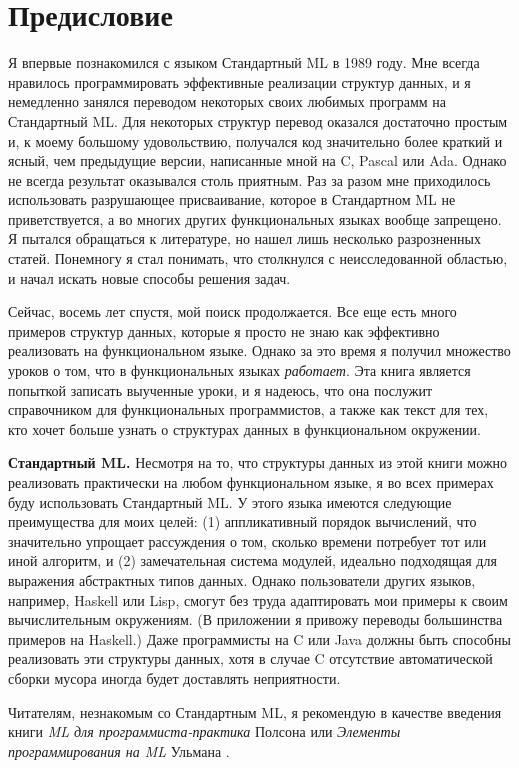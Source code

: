 \chapter*{Предисловие}

Я впервые познакомился с языком Стандартный ML в 1989 году. Мне всегда
нравилось программировать эффективные реализации структур данных,
и я немедленно занялся переводом некоторых своих любимых программ
на Стандартный ML. Для некоторых структур перевод оказался достаточно
простым и, к моему большому удовольствию, получался код значительно более краткий
и ясный, чем предыдущие версии, написанные мной на C, Pascal или
Ada.  Однако не всегда результат оказывался столь приятным. Раз за
разом мне приходилось использовать разрушающее присваивание, которое в
Стандартном ML не приветствуется, а во многих других функциональных
языках вообще запрещено.  Я пытался обращаться к литературе, но
нашел лишь несколько разрозненных статей.  Понемногу я стал понимать,
что столкнулся с неисследованной областью, и начал искать новые
способы решения задач.

Сейчас, восемь лет спустя, мой поиск продолжается. Все еще есть много
примеров структур данных, которые я просто не знаю как эффективно
реализовать на функциональном языке. Однако за это время я получил
множество уроков о том, что в функциональных языках
\textit{работает}.  Эта книга является попыткой записать выученные
уроки, и я надеюсь, что она послужит справочником для функциональных
программистов, а также как текст для тех, кто хочет больше узнать о
структурах данных в функциональном окружении.

\textbf{Стандартный ML.} Несмотря на то, что структуры данных из этой
книги можно реализовать практически на любом функциональном языке, я
во всех примерах буду использовать Стандартный ML.  У этого языка
имеются следующие преимущества для моих целей: (1)  аппликативный
порядок вычислений, что значительно упрощает рассуждения о том,
сколько времени потребует тот или иной алгоритм, и (2) замечательная
система модулей, идеально подходящая для выражения абстрактных типов
данных.  Однако пользователи других языков, например, Haskell или
Lisp, смогут без труда адаптировать мои примеры к своим вычислительным
окружениям. (В приложении я привожу переводы большинства примеров на
Haskell.) Даже программисты на C или Java должны быть способны
реализовать эти структуры данных, хотя в случае C отсутствие
автоматической сборки мусора иногда будет доставлять неприятности.

Читателям, незнакомым со Стандартным ML, я рекомендую в качестве
введения книги \textit{ML для программиста-практика} Полсона
\cite{Paulson96} или \textit{Элементы программирования на ML}
Ульмана \cite{Ullman94}.

